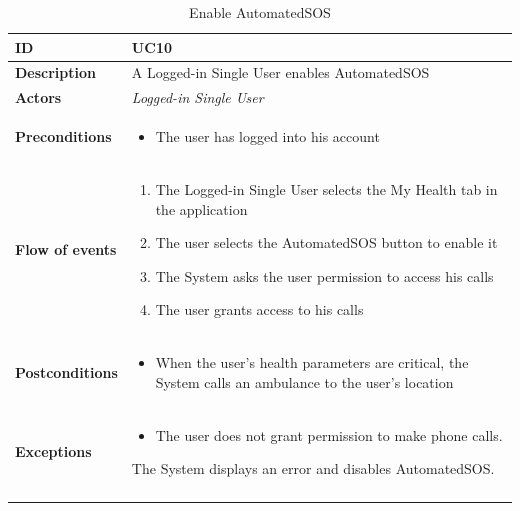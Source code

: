 \documentclass[titlepage]{article}
\begin{document}
\begin{longtable}{| p{3 cm} | p{10 cm} |} 
			\hline
			{\bf ID} & UC10 \\
			\hline
			{\bf Description} & A Logged-in Single User enables AutomatedSOS  \\
			\hline
			{\bf Actors} & {\it Logged-in Single User }\\
			\hline
			{\bf Preconditions} & 		
							\begin{itemize}
								\item The user has logged into his account
							\end{itemize}
			\\
			\hline
			{\bf Flow of events} & 
							\begin{enumerate}
								\item The Logged-in Single User selects the My Health tab in the application
\item The user selects the AutomatedSOS button to enable it
\item The System asks the user permission to access his calls
\item The user grants access to his calls

							\end{enumerate}
			
			 \\
			\hline
			{\bf Postconditions} & 
							\begin{itemize}
								\item When the user’s health parameters are critical, the System calls an ambulance to the user’s location

							\end{itemize}
			\\
			\hline
			{\bf Exceptions} & 
							\begin{itemize}
								\item The user does not grant permission to make phone calls.
							\end{itemize}
							The System displays an error and disables AutomatedSOS.							
			\\
			\hline
			\caption{Enable AutomatedSOS}
			\end{longtable}

\end{document}
